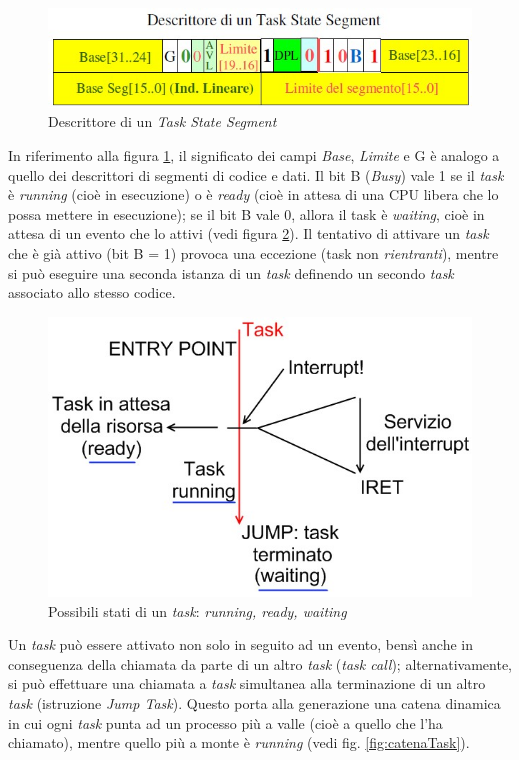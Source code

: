 \begin{figure}[!h]
\centering
\includegraphics[width=0.65\columnwidth]{img/taskStateSegment}
\caption{Descrittore di un \textit{Task State Segment}}
\label{fig:taskStateSegment}
\end{figure}

In riferimento alla figura \ref{fig:taskStateSegment}, il significato dei campi \textit{Base}, \textit{Limite} e G è analogo a quello dei descrittori di segmenti di codice e dati. Il bit B (\textit{Busy}) vale 1 se il \textit{task} è \textit{running} (cioè in esecuzione) o è \textit{ready} (cioè in attesa di una CPU libera che lo possa mettere in esecuzione); se il bit B vale 0, allora il task è \textit{waiting}, cioè in attesa di un evento che lo attivi (vedi figura \ref{fig:taskStati}). Il tentativo di attivare un \textit{task} che è già attivo (bit B = 1) provoca una eccezione (task non \textit{rientranti}), mentre si può eseguire una seconda istanza di un \textit{task} definendo un secondo \textit{task} associato allo stesso codice. 

\begin{figure}[!h]
\centering
\includegraphics[width=0.55\columnwidth]{img/taskStati}
\caption{Possibili stati di un \textit{task}: \textit{running, ready, waiting}}
\label{fig:taskStati}
\end{figure}

Un \textit{task} può essere attivato non solo in seguito ad un evento, bensì anche in conseguenza della chiamata da parte di un altro \textit{task} (\textit{task call}); alternativamente, si può effettuare una chiamata a \textit{task} simultanea alla terminazione di un altro \textit{task} (istruzione \textit{Jump Task}).
Questo porta alla generazione una catena dinamica in cui ogni \textit{task} punta ad un processo più a valle (cioè a quello che l'ha chiamato), mentre quello più a monte è \textit{running} (vedi fig. \ref{fig:catenaTask}).

